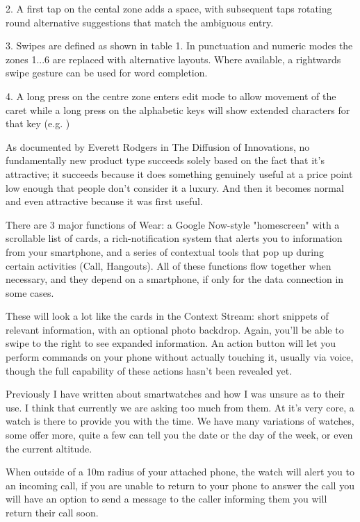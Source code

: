 \documentclass{article}
\begin{document}
2. A first tap on the cental zone adds a space, with subsequent taps rotating round alternative suggestions that match the ambiguous entry. 

3. Swipes are defined as shown in table 1. In punctuation and numeric modes the zones 1...6 are replaced with alternative layouts. Where available, a rightwards swipe gesture can be used for word completion. 

4. A long press on the centre zone enters edit mode to allow movement of the caret while a long press on the alphabetic keys will show extended characters for that key (e.g. )

As documented by Everett Rodgers in The Diffusion of Innovations, no fundamentally new product type succeeds solely based on the fact that it’s attractive; it succeeds because it does something genuinely useful at a price point low enough that people don’t consider it a luxury. And then it becomes normal and even attractive because it was first useful.

There are 3 major functions of Wear: a Google Now-style "homescreen" with a scrollable list of cards, a rich-notification system that alerts you to information from your smartphone, and a series of contextual tools that pop up during certain activities (Call, Hangouts). All of these functions flow together when necessary, and they depend on a smartphone, if only for the data connection in some cases.

These will look a lot like the cards in the Context Stream: short snippets of relevant information, with an optional photo backdrop. Again, you'll be able to swipe to the right to see expanded information. An action button will let you perform commands on your phone without actually touching it, usually via voice, though the full capability of these actions hasn't been revealed yet.
 
Previously I have written about smartwatches and how I was unsure as to their use. I think that currently we are asking too much from them. At it’s very core, a watch is there to provide you with the time. We have many variations of watches, some offer more, quite a few can tell you the date or the day of the week, or even the current altitude.

When outside of a 10m radius of your attached phone, the watch will alert you to an incoming call, if you are unable to return to your phone to answer the call you will have an option to send a message to the caller informing them you will return their call soon.
\end{document}

